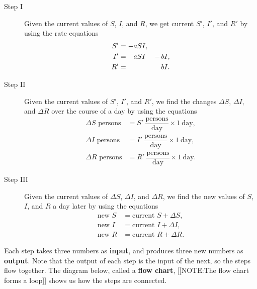 \begin{description}
\item[Step I] Given the current values of $S$, $I$, and $R$, we get
  current $S'$, $I'$, and $R'$ by using the rate equations
\begin{alignat*}{2}
		S' &= - a S I, &   &     \\
		I' &= \hphantom{-}a S I & -\, & b I,  \\
		R' &=          &   & b I.
\end{alignat*}
\item[Step II] Given the current values of $S'$, $I'$, and $R'$, we
  find the changes $\Delta S$, $\Delta I$, and $\Delta R$ over the
  course of a day by using the equations
\begin{align*}
\Delta S \mbox{ persons} &= S' \ \dfrac{\mbox{persons}}{\mbox{day}} 
          \times 1 \ \mbox{day}, \\[4pt]
\Delta I \mbox{ persons} &= I' \ \dfrac{\mbox{persons}}{\mbox{day}} 
          \times 1 \ \mbox{day}, \\[4pt]
\Delta R \mbox{ persons} &= R' \ \dfrac{\mbox{persons}}{\mbox{day}} 
          \times 1 \ \mbox{day}.
\end{align*}
\item[Step III] Given the current values of $\Delta S$, $\Delta I$,
  and $\Delta R$, we find the new values of $S$, $I$, and $R$ a day
  later by using the equations
\begin{align*}
	\mbox{new $S$} &= \mbox{current $S$} + \Delta S, \\
	\mbox{new $I$} &= \mbox{current $I$} + \Delta I, \\
	\mbox{new $R$} &= \mbox{current $R$} + \Delta R.
\end{align*}
\end{description}


Each step takes three numbers as {\bf input}, and
produces three new numbers as {\bf output}. Note that
the output of each step is the input of the next, so the steps flow
together.  The diagram below, called a {\bf flow chart}, 
[[NOTE:The flow chart  forms a loop]] 
shows us how the steps are connected.

